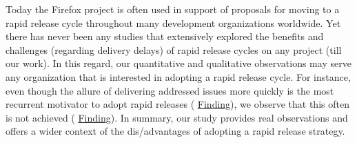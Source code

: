 Today the Firefox project is often used in support of proposals for moving to a
rapid release cycle throughout many development organizations worldwide. Yet
there has never been any studies that extensively explored the benefits and
challenges (regarding delivery delays) of rapid release cycles on any project
(till our work).  In this regard, our quantitative and qualitative observations
may serve any organization that is interested in adopting a rapid release cycle.
For instance, even though the allure of delivering addressed issues more quickly
is the most recurrent motivator to adopt rapid releases
(\DIFdelbegin %
\DIFdel{~\ref{th:7}}\DIFdelend \DIFaddbegin \hyperref[find32]{Finding}\DIFadd{~\ref{find32}}\DIFaddend ), we observe that this often is not achieved
(\DIFdelbegin %
\DIFdel{~\ref{obs:2}}\DIFdelend \DIFaddbegin \hyperref[find18]{Finding}\DIFadd{~\ref{find18}}\DIFaddend ). In summary, our study provides real
observations and offers a wider context of the dis/advantages of adopting a
rapid release strategy.

